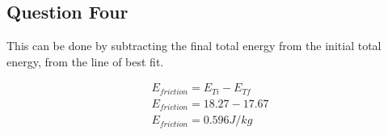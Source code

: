 \documentclass[10pt,twocolumn,letterpaper]{article}
\begin{document}
\subsection{Question Four}
This can be done by subtracting the final total energy from the initial total energy, from the line of best fit. 

\begin{align}
    \nonumber E_{friction} = E_{Ti} - E_{Tf} \\
    \nonumber E_{friction} = 18.27 - 17.67 \\
    \nonumber E_{friction} = 0.596 J/kg
\end{align}
\end{document}
